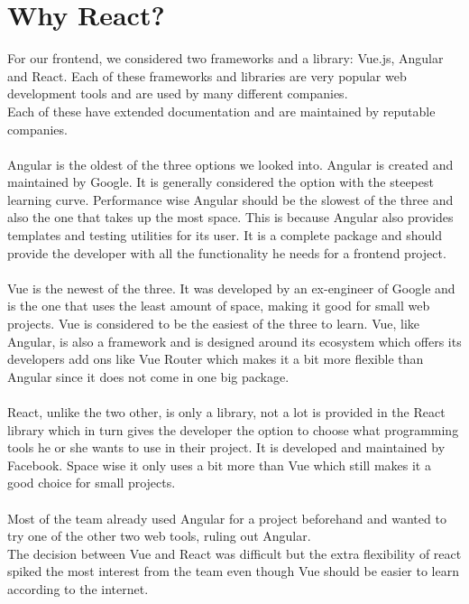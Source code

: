 \section{Why React?}
For our frontend, we considered two frameworks and a library: Vue.js, Angular and React.
Each of these frameworks and libraries are very popular web development tools and are used by many different companies\cite{VueReactAngular}.
\\
Each of these have extended documentation and are maintained by reputable companies.
\\\\
Angular is the oldest of the three options we looked into. 
Angular is created and maintained by Google.
It is generally considered the option with the steepest learning curve.
Performance wise Angular should be the slowest of the three and also the one that takes up the most space.
This is because Angular also provides templates and testing utilities for its user.
It is a complete package and should provide the developer with all the functionality he needs for a frontend project.
\\\\
Vue is the newest of the three. 
It was developed by an ex-engineer of Google and is the one that uses the least amount of space, making it good for small web projects.
Vue is considered to be the easiest of the three to learn.
Vue, like Angular, is also a framework and is designed around its ecosystem which offers its developers add ons like Vue Router which makes it a bit more flexible than Angular since it does not come in one big package.
\\\\
React, unlike the two other, is only a library, not a lot is provided in the React library which in turn gives the developer the option to choose what programming tools he or she wants to use in their project.
It is developed and maintained by Facebook.
Space wise it only uses a bit more than Vue which still makes it a good choice for small projects.
\\\\
Most of the team already used Angular for a project beforehand and wanted to try one of the other two web tools, ruling out Angular. 
\\
The decision between Vue and React was difficult but the extra flexibility of react spiked the most interest from the team even though Vue should be easier to learn according to the internet.


